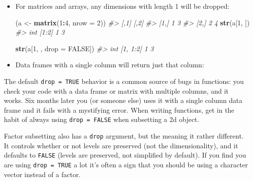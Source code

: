 \documentclass[]{book}
\newenvironment{Shaded}{\begin{snugshade}}{\end{snugshade}}
\newcommand{\CommentTok}[1]{\textcolor[rgb]{0.56,0.35,0.01}{\textit{#1}}}
\newcommand{\DataTypeTok}[1]{\textcolor[rgb]{0.13,0.29,0.53}{#1}}
\newcommand{\DecValTok}[1]{\textcolor[rgb]{0.00,0.00,0.81}{#1}}
\newcommand{\KeywordTok}[1]{\textcolor[rgb]{0.13,0.29,0.53}{\textbf{#1}}}
\newcommand{\NormalTok}[1]{#1}
\newcommand{\OperatorTok}[1]{\textcolor[rgb]{0.81,0.36,0.00}{\textbf{#1}}}
\newcommand{\OtherTok}[1]{\textcolor[rgb]{0.56,0.35,0.01}{#1}}
\newcommand{\StringTok}[1]{\textcolor[rgb]{0.31,0.60,0.02}{#1}}
\theoremstyle{definition}
\theoremstyle{definition}
\theoremstyle{definition}
\theoremstyle{remark}
\begin{document}
\begin{itemize}
\item
  For matrices and arrays, any dimensions with length 1 will be dropped:

\begin{Shaded}
\begin{Highlighting}[]
\NormalTok{(a <-}\StringTok{ }\KeywordTok{matrix}\NormalTok{(}\DecValTok{1}\OperatorTok{:}\DecValTok{4}\NormalTok{, }\DataTypeTok{nrow =} \DecValTok{2}\NormalTok{))}
\CommentTok{#>      [,1] [,2]}
\CommentTok{#> [1,]    1    3}
\CommentTok{#> [2,]    2    4}
\KeywordTok{str}\NormalTok{(a[}\DecValTok{1}\NormalTok{, ])}
\CommentTok{#>  int [1:2] 1 3}

\KeywordTok{str}\NormalTok{(a[}\DecValTok{1}\NormalTok{, , }\DataTypeTok{drop =} \OtherTok{FALSE}\NormalTok{])}
\CommentTok{#>  int [1, 1:2] 1 3}
\end{Highlighting}
\end{Shaded}
\item
  Data frames with a single column will return just that column:

\begin{Shaded}
\end{Shaded}
\end{itemize}

The default \texttt{drop\ =\ TRUE} behavior is a common source of bugs
in functions: you check your code with a data frame or matrix with
multiple columns, and it works. Six months later you (or someone else)
uses it with a single column data frame and it fails with a mystifying
error. When writing functions, get in the habit of always using
\texttt{drop\ =\ FALSE} when subsetting a 2d object.

Factor subsetting also has a \texttt{drop} argument, but the meaning it
rather different. It controls whether or not levels are preserved (not
the dimensionality), and it defaults to \texttt{FALSE} (levels are
preserved, not simplified by default). If you find you are using
\texttt{drop\ =\ TRUE} a lot it's often a sign that you should be using
a character vector instead of a factor.
\end{document}
